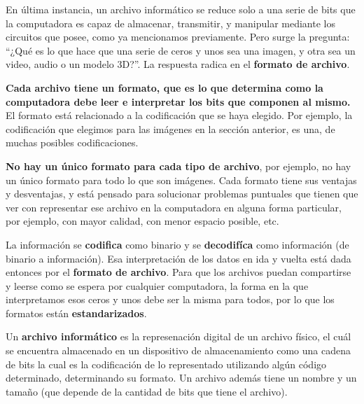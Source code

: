 En última instancia, un archivo informático se reduce solo a una serie de bits que la
computadora es capaz de almacenar, transmitir, y manipular mediante los circuitos
que posee, como ya mencionamos previamente. Pero surge la pregunta: ``¿Qué es lo
que hace que una serie de ceros y unos sea una imagen, y otra sea un video, audio
o un modelo 3D?''. La respuesta radica en el \textbf{formato de archivo}.

\textbf{Cada archivo tiene un formato, que es lo que determina como la computadora
debe leer e interpretar los bits que componen al mismo.} El formato
está relacionado a la codificación que se haya elegido. Por ejemplo, la
codificación que elegimos para las imágenes en la sección anterior, es una, de
muchas posibles codificaciones.

\textbf{No hay un único formato para cada tipo de archivo}, por ejemplo, no hay
un único formato para todo lo que son imágenes. Cada formato tiene sus ventajas
y desventajas, y está pensado para solucionar problemas puntuales que tienen
que ver con representar ese archivo en la computadora en alguna forma particular,
por ejemplo, con mayor calidad, con menor espacio posible, etc.

La información se \textbf{codifica} como binario y se \textbf{decodifíca} como
información (de binario a información). Esa interpretación de los datos en ida y
vuelta está dada entonces por el \textbf{formato de archivo}. Para que los
archivos puedan compartirse y leerse como se espera por cualquier computadora,
la forma en la que interpretamos esos ceros y unos debe ser la misma para todos,
por lo que los formatos están \textbf{estandarizados}.

\begin{definition}
    Un \textbf{archivo informático} es la represenación digital de un archivo
    físico, el cuál se encuentra almacenado en un dispositivo de almacenamiento
    como una cadena de bits la cual es la codificación de lo representado utilizando
    algún código determinado, determinando su formato. Un archivo además tiene un
    nombre y un tamaño (que depende de la cantidad de bits que tiene el archivo).\autocite[vid. p.13]{gookin_2005}
\end{definition}

